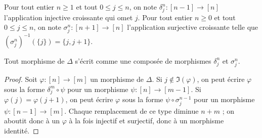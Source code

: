 \begin{definition}
\label{definition-face-degeneracy}
Pour tout entier $n\geq 1$ et tout $0\leq j \leq n$, on note
{\it $\delta^n_j : [n-1] \to [n]$}
l'application injective croissante qui omet $j$. Pour tout entier
$n\geq 0$ et tout $0\leq j \leq n$, on note
{\it $\sigma^n_j : [n + 1]  \to [n]$}
l'application surjective croissante telle que
$(\sigma^n_j)^{-1}(\{j\}) = \{j, j + 1\}$.
\end{definition}

\begin{lemma}
\label{lemma-face-degeneracy}
Tout morphisme de $\Delta$ s'écrit comme une composée de morphismes
$\delta^n_j$ et $\sigma^n_j$.
\end{lemma}

\begin{proof}
Soit $\varphi : [n] \to [m]$ un morphisme de $\Delta$.
Si $j \not \in \Im(\varphi)$, on peut écrire
$\varphi$ sous la forme $\delta^m_j \circ \psi$ pour un morphisme
$\psi : [n] \to [m - 1]$. Si $\varphi(j) = \varphi(j + 1)$,
on peut écrire $\varphi$ sous la forme $\psi \circ \sigma^{n - 1}_j$
pour un morphisme $\psi : [n - 1] \to [m]$.
Chaque remplacement de ce type diminue $n + m$ ; on aboutit donc à un
$\varphi$ à la fois injectif et surjectif, donc à un morphisme identité.
\end{proof}

